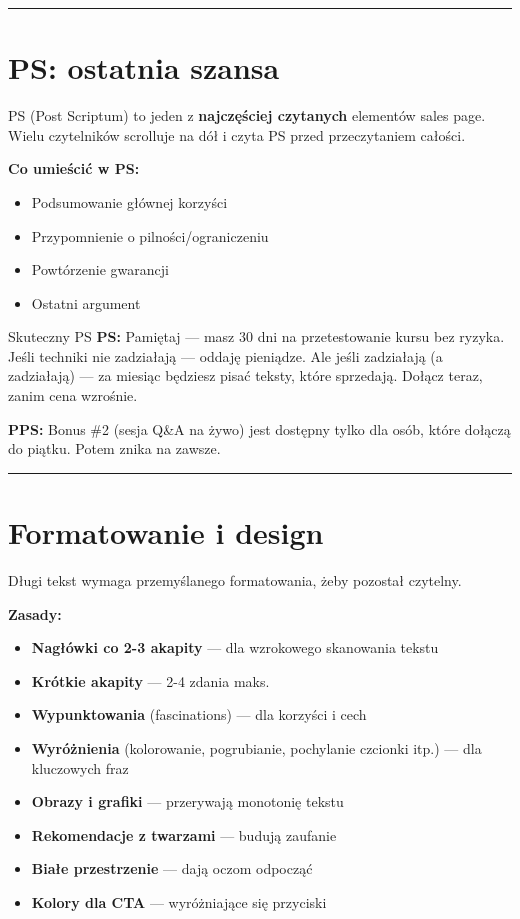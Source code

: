 \documentclass[
  12pt,
  a4paper,
  twoside,
  openright,
  12pt,
  DIV=12,
  BCOR=12mm]{scrbook}
\providecommand{\tightlist}{%
  \setlength{\itemsep}{0pt}\setlength{\parskip}{0pt}}\usepackage{longtable,booktabs,array}
\newcommand{\decoline}{%
  \begin{center}
    \textcolor{bordergray}{\rule{0.3\textwidth}{0.5pt}}
  \end{center}
}
\begin{document}
\decoline

\section{PS: ostatnia szansa}\label{ps-ostatnia-szansa}

PS (Post Scriptum) to jeden z \textbf{najczęściej czytanych} elementów
sales page. Wielu czytelników scrolluje na dół i czyta PS przed
przeczytaniem całości.

\textbf{Co umieścić w PS:}

\begin{itemize}
\tightlist
\item
  Podsumowanie głównej korzyści
\item
  Przypomnienie o pilności/ograniczeniu
\item
  Powtórzenie gwarancji
\item
  Ostatni argument
\end{itemize}

\begin{przyklad}{Skuteczny PS}
\textbf{PS:} Pamiętaj --- masz 30 dni na przetestowanie kursu bez ryzyka. Jeśli techniki nie zadziałają --- oddaję pieniądze. Ale jeśli zadziałają (a zadziałają) --- za miesiąc będziesz pisać teksty, które sprzedają. Dołącz teraz, zanim cena wzrośnie.

\textbf{PPS:} Bonus \#2 (sesja Q\&A na żywo) jest dostępny tylko dla osób, które dołączą do piątku. Potem znika na zawsze.
\end{przyklad}

\decoline

\section{Formatowanie i design}\label{formatowanie-i-design}

Długi tekst wymaga przemyślanego formatowania, żeby pozostał czytelny.

\textbf{Zasady:}

\begin{itemize}
\tightlist
\item
  \textbf{Nagłówki co 2-3 akapity} --- dla wzrokowego skanowania tekstu
\item
  \textbf{Krótkie akapity} --- 2-4 zdania maks.
\item
  \textbf{Wypunktowania} (fascinations) --- dla korzyści i cech
\item
  \textbf{Wyróżnienia} (kolorowanie, pogrubianie, pochylanie czcionki
  itp.) --- dla kluczowych fraz
\item
  \textbf{Obrazy i grafiki} --- przerywają monotonię tekstu
\item
  \textbf{Rekomendacje z twarzami} --- budują zaufanie
\item
  \textbf{Białe przestrzenie} --- dają oczom odpocząć
\item
  \textbf{Kolory dla CTA} --- wyróżniające się przyciski
\end{itemize}
\end{document}
